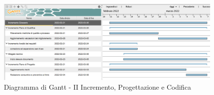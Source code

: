 \begin{figure}[H]
	\centering
	\includegraphics[scale=0.35]{Sezioni/gantt/II_incremento.png}
	\caption{Diagramma di Gantt - II Incremento, Progettazione e Codifica}
\end{figure}

\pagebreak

